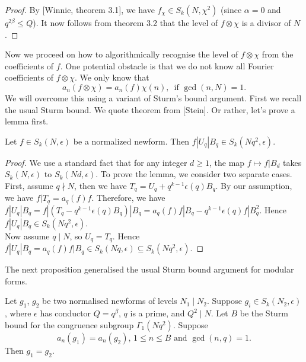 \documentclass [11pt, proquest] {uwthesis}[2015/03/03]
\begin{document}
\begin{proof}
By [Winnie, theorem 3.1], we have $f_\chi \in S_k(N, \chi^2)$ (since $\alpha = 0$ and $q^{2\beta} \leq Q$). It now follows from theorem 3.2 that the level of $f \otimes \chi$ is a divisor of $N$.
\end{proof}

Now we proceed on how to algorithmically recognise the level of $f \otimes \chi$ from the coefficients of $f$. One potential obstacle is that we do not know all Fourier coefficients of $f \otimes \chi$. We only know that 
\[
	a_n(f \otimes \chi)  = a_n(f)\chi(n), \,  \mbox{ if }  \gcd(n, N) = 1.
\]
We will overcome this using a variant of Sturm's bound argument. First we recall the usual Sturm bound. 
We quote theorem from [Stein]. Or rather, let's prove a lemma first. 

\begin{Lemma}
Let $f \in S_k(N, \epsilon)$ be a normalized newform. Then $f|U_q|B_q \in S_k(Nq^2, \epsilon)$.
\end{Lemma}

\begin{proof}
We use a standard fact that for any integer $d \geq 1$, the map $f \mapsto f|B_d$ takes $S_k(N, \epsilon)$ to 
$S_k(Nd, \epsilon)$. To prove the lemma, we consider two separate cases. First, assume $q \nmid N$, then we have 
$T_q = U_q + q^{k-1} \epsilon(q) B_q$. By our assumption, we have $f|T_q = a_q(f) f$. Therefore, we have 
$f|U_q|B_q = f|(T_q - q^{k-1} \epsilon(q) B_q)|B_q = a_q(f)f|B_q - q^{k-1} \epsilon(q) f|B_q^2$. Hence $f|U_q|B_q \in S_k(Nq^2, \epsilon)$. \\
Now assume $q \mid N$, so $U_q = T_q$. Hence $f|U_q|B_q = a_q(f) f|B_q \in S_k(Nq, \epsilon) \subseteq  S_k(Nq^2, \epsilon)$. 
\end{proof}

The next proposition generalised the usual Sturm bound argument for modular forms. 

\begin{Prop}
Let $g_1$, $g_2$ be two normalised newforms of levels $N_1 \mid N_2$. Suppose $g_i \in S_k(N_2, \epsilon)$, where $\epsilon$ has conductor $Q = q^\beta$, $q$ is a prime, and  $Q^2 \mid N$. Let 
$B$ be the Sturm bound for the congruence subgroup $\Gamma_1(Nq^2)$. Suppose 
\[
	a_n(g_1) = a_n(g_2), \, 1 \leq n \leq B \mbox{ and } \gcd(n,q) = 1.
\]
Then $g_1 = g_2$. 
\end{Prop}
\end{document}

